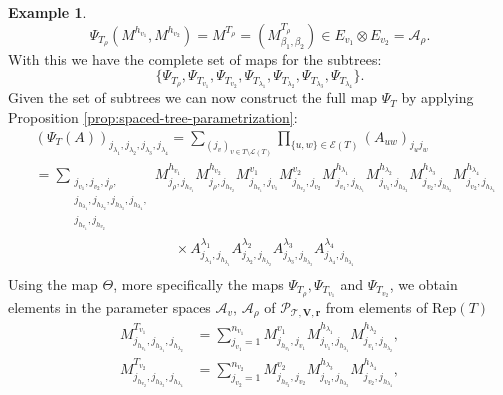 \documentclass[12pt]{article}
\theoremstyle{definition}
\newtheorem{example}[theorem]{Example}
\numberwithin{theorem}{section}
\begin{document}
\begin{example}
\begin{equation*}
    \Psi_{T_{\rho}}(M^{h_{v_1}}, M^{h_{v_2}}) = M^{T_{\rho}} = (M^{T_{\rho}}_{\beta_1, \beta_2})\in E_{v_1} \otimes E_{v_2} = \mathcal{A}_\rho.
\end{equation*}
With this we have the complete set of maps for the subtrees:
\begin{equation*}
    \{\Psi_{T_{\rho}},\Psi_{T_{v_1}}, \Psi_{T_{v_2}}, \Psi_{T_{\lambda_1}}, \Psi_{T_{\lambda_2}}, \Psi_{T_{\lambda_3}}, \Psi_{T_{\lambda_4}}\}.
\end{equation*}
Given the set of subtrees we can now construct the full map $\Psi_T$ by applying Proposition \ref{prop:spaced-tree-parametrization}:
\begin{align*}
    &(\Psi_T(A))_{j_{\lambda_1},j_{\lambda_2},j_{\lambda_3},j_{\lambda_4}} = \sum_{(j_v)_{v\in T \setminus \mathcal{L}(T)}} \prod_{\{u,w\} \in \mathcal{E}(T)} (A_{uw})_{j_u j_w} \\
    &= \sum_{\substack{j_{v_1}, j_{v_2}, j_\rho, \\ j_{h_{\lambda_1}}, j_{h_{\lambda_2}}, j_{h_{\lambda_3}}, j_{h_{\lambda_4}}, \\ j_{h_{v_1}}, j_{h_{v_2}}}}
    M^{h_{v_1}}_{j_\rho, j_{h_{v_1}}} M^{h_{v_2}}_{j_\rho, j_{h_{v_2}}}M^{v_1}_{j_{h_{v_1}}, j_{v_1}}M^{v_2}_{j_{h_{v_2}}, j_{v_2}}M^{h_{\lambda_1}}_{j_{v_1}, j_{h_{\lambda_1}}}M^{h_{\lambda_2}}_{j_{v_1}, j_{h_{\lambda_2}}}M^{h_{\lambda_3}}_{j_{v_2}, j_{h_{\lambda_3}}}M^{h_{\lambda_4}}_{j_{v_2}, j_{h_{\lambda_4}}} \\ & \qquad\qquad\qquad\qquad\qquad \times   A^{\lambda_1}_{j_{\lambda_1},j_{h_{\lambda_1}}}A^{\lambda_2}_{j_{\lambda_2},j_{h_{\lambda_2}}}A^{\lambda_3}_{j_{\lambda_3},j_{h_{\lambda_3}}}A^{\lambda_4}_{j_{\lambda_4},j_{h_{\lambda_4}}}\\
\end{align*}
Using the map $\Theta$, more specifically the maps $\Psi_{T_{\rho}},\Psi_{T_{v_1}}$ and $\Psi_{T_{v_2}}$, we obtain elements in the parameter spaces $\mathcal{A}_v,\,\mathcal{A}_\rho$ of $\mathcal{P}_{\mathscr{T}, \mathbf{V}, \mathbf{r}}$ from elements of $\mathrm{Rep}(T)$
\begin{align*}
    M^{T_{v_1}}_{j_{h_{v_1}}, j_{h_{\lambda_1}}, j_{h_{\lambda_2}}} &= \sum_{j_{v_1}=1}^{n_{v_1}}M^{v_1}_{j_{h_{v_1}}, j_{v_1}}M^{h_{\lambda_1}}_{j_{v_1}, j_{h_{\lambda_1}}}M^{h_{\lambda_2}}_{j_{v_1}, j_{h_{\lambda_2}}}, \\
    M^{T_{v_2}}_{j_{h_{v_2}}, j_{h_{\lambda_3}}, j_{h_{\lambda_4}}} &= \sum_{j_{v_2}=1}^{n_{v_2}}M^{v_2}_{j_{h_{v_2}}, j_{v_2}}M^{h_{\lambda_3}}_{j_{v_2}, j_{h_{\lambda_3}}}M^{h_{\lambda_4}}_{j_{v_2}, j_{h_{\lambda_4}}}, \\

\end{align*}
\end{example}
\end{document}
